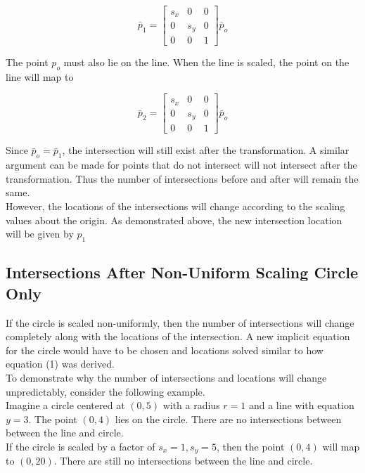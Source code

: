 \documentclass[a4paper,10pt]{scrartcl}
\begin{document}
\[\bar p_1 = \begin{bmatrix}
    s_x       & 0 & 0 \\
    0       & s_y & 0 \\
    0       & 0 & 1     
 \end{bmatrix} \bar p_o\]
 
 The point $p_o$ must also lie on the line. When the line is scaled, the point on the line will map to
 
 \[\bar p_2 = \begin{bmatrix}
    s_x       & 0 & 0 \\
    0       & s_y & 0 \\
    0       & 0 & 1     
 \end{bmatrix} \bar p_o\]
 
 
Since $\bar p_o = \bar p_1$, the intersection will still exist after the transformation. A similar argument can be made for points that do not intersect will not intersect after the transformation. Thus
the number of intersections before and after will remain the same.\\

However, the locations of the intersections will change according to the scaling values about the origin. As demonstrated above, the new intersection location will be given by $p_1$\\

\subsection{Intersections After Non-Uniform Scaling Circle Only}

If the circle is scaled non-uniformly, then the number of intersections will change completely along with the locations of the intersection. A new implicit equation for the circle would have to be chosen
and locations solved similar to how equation (1) was derived.\\

To demonstrate why the number of intersections and locations will change unpredictably, consider the following example.\\

Imagine a circle centered at $(0,5)$ with a radius $r = 1$ and a line with equation $y = 3$. The point $(0, 4)$ lies on the circle. There are no intersections between between the line and circle.\\

If the circle is scaled by a factor of $s_x = 1, s_y = 5$, then the point $(0,4)$ will map to $(0, 20)$. There are still no intersections between the line and circle.\\
\end{document}
